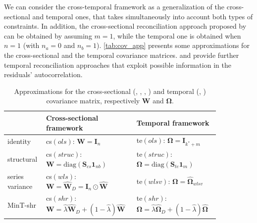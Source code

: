 \documentclass[a4paper,11pt]{article}
\newcommand{\Ivet}{\bm{I}}
\newcommand{\Svet}{\bm{S}}
\newcommand{\Wvet}{\bm{W}}
\newcommand{\Omegavet}{\bm{\Omega}}
\theoremstyle{definition}
\begin{document}
We can consider the cross-temporal framework as a generalization of the cross-sectional and temporal ones, that takes simultaneously into account both types of constraints. In addition, the cross-sectional reconciliation approach proposed by \cite{hyndman2011} can be obtained by assuming $m = 1$, while the temporal one \citep{athanasopoulos2017} is obtained when $n = 1$ (with $n_a = 0$ and $n_b = 1$). \autoref{tab:cov_app} presents some approximations for the cross-sectional and the temporal covariance matrices. \cite{nystrup2020} and \cite{difonzo2023} provide further temporal reconciliation approaches that exploit possible information in the residuals' autocorrelation.

\begin{table}[bt]
	\caption{Approximations for the cross-sectional (\citealp{hyndman2011}, \citealp{hyndman2016}, \citealp{wickramasuriya2019}, \citealp{difonzo2023}) and temporal (\citealp{athanasopoulos2017}, \citealp{difonzo2023}) covariance matrix, respectively $\Wvet$ and $\Omegavet$.}
	\label{tab:cov_app}
	\centering
	\footnotesize
	\begin{tabular}{>{\raggedleft\arraybackslash}m{0.15\linewidth}|>{\centering\arraybackslash}m{0.35\linewidth}|>{\centering\arraybackslash}m{0.35\linewidth}}
		\toprule
		                & \textbf{Cross-sectional framework}                                                     & \textbf{Temporal framework}                                                                        \\
		\midrule
		identity        & cs$(ols)$: $\Wvet = \Ivet_n$                                                           & te$(ols)$: $\Omegavet = \Ivet_{k^\ast + m}$                                                        \\[0.1cm]
		structural      & cs$(struc)$: $\Wvet = \mathrm{diag}(\Svet_{cs} \mathbf{1}_{nb})$                       & te$(struc)$: $\Omegavet = \mathrm{diag}(\Svet_{te} \mathbf{1}_{m})$                                \\[0.1cm]
		series variance & cs$(wls)$: $\Wvet = \widehat{\Wvet}_D = \Ivet_n \odot \widehat{\Wvet}$                 & te$(wlsv)$: $\Omegavet = \widehat{\Omegavet}_{wlsv}$                                               \\[0.1cm]
		MinT-shr        & cs$(shr)$: $\Wvet = \hat{\lambda}\widehat{\Wvet}_D + (1-\hat{\lambda})\widehat{\Wvet}$ & te$(shr)$: $\Omegavet = \hat{\lambda}\widehat{\Omegavet}_D + (1-\hat{\lambda})\widehat{\Omegavet}$ \\[0.1cm]

\end{tabular}
\end{table}
\end{document}
